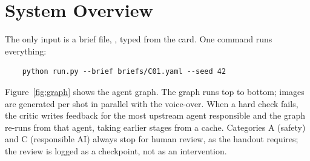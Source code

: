 \documentclass[twoside,11pt]{article}
\begin{document}
\section{System Overview}
\label{sec:system}

The only input is a brief file, , typed from the card. One command runs everything:
\begin{verbatim}
    python run.py --brief briefs/C01.yaml --seed 42
\end{verbatim}
Figure~\ref{fig:graph} shows the agent graph. The graph runs top to bottom; images are generated per shot in parallel with the voice-over. When a hard check fails, the critic writes feedback for the most upstream agent responsible and the graph re-runs from that agent, taking earlier stages from a cache. Categories A (safety) and C (responsible AI) always stop for human review, as the handout requires; the review is logged as a checkpoint, not as an intervention.
\end{document}
